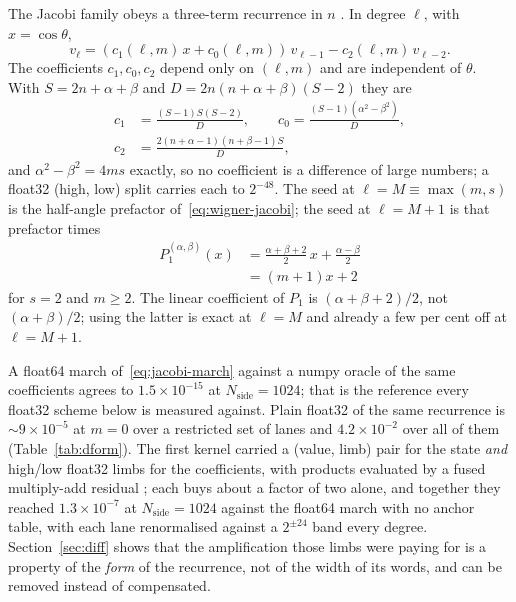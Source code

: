 \documentclass[usenatbib,useAMS]{mnras}
\begin{document}
The Jacobi family obeys a three-term recurrence in $n$ \citep[NIST DLMF 18.9.1]{olver2010}. In degree $\ell$, with $x=\cos\theta$,
\begin{equation}
\label{eq:jacobi-march}
  v_\ell
  =(c_1(\ell,m)\,x+c_0(\ell,m))\,v_{\ell-1}
   -c_2(\ell,m)\,v_{\ell-2}.
\end{equation}
The coefficients $c_1,c_0,c_2$ depend only on $(\ell,m)$ and are independent of $\theta$. With $S=2n+\alpha+\beta$ and $D=2n(n+\alpha+\beta)(S-2)$ they are
\begin{equation}
\label{eq:coef}
\begin{split}
c_1&=\frac{(S-1)S(S-2)}{D},\qquad
c_0=\frac{(S-1)(\alpha^2-\beta^2)}{D},\\
c_2&=\frac{2(n+\alpha-1)(n+\beta-1)S}{D},
\end{split}
\end{equation}
and $\alpha^2-\beta^2=4ms$ exactly, so no coefficient is a difference of large numbers; a float32 (high, low) split carries each to $2^{-48}$. The seed at $\ell=M\equiv\max(m,s)$ is the half-angle prefactor of~\eqref{eq:wigner-jacobi}; the seed at $\ell=M+1$ is that prefactor times
\begin{equation}
\label{eq:p1}
\begin{split}
  P_1^{(\alpha,\beta)}(x)
  &=\frac{\alpha+\beta+2}{2}\,x+\frac{\alpha-\beta}{2}\\
  &=(m+1)x+2
\end{split}
\end{equation}
for $s=2$ and $m\ge2$. The linear coefficient of $P_1$ is $(\alpha+\beta+2)/2$, not $(\alpha+\beta)/2$; using the latter is exact at $\ell=M$ and already a few per cent off at $\ell=M+1$.

A float64 march of~\eqref{eq:jacobi-march} against a numpy oracle of the same coefficients agrees to $1.5\times10^{-15}$ at $N_{\mathrm{side}}=1024$; that is the reference every float32 scheme below is measured against. Plain float32 of the same recurrence is $\sim9\times10^{-5}$ at $m=0$ over a restricted set of lanes and $4.2\times10^{-2}$ over all of them (Table~\ref{tab:dform}). The first kernel carried a (value, limb) pair for the state \emph{and} high/low float32 limbs for the coefficients, with products evaluated by a fused multiply-add residual \citep{dekker1971}; each buys about a factor of two alone, and together they reached $1.3\times10^{-7}$ at $N_{\mathrm{side}}=1024$ against the float64 march with no anchor table, with each lane renormalised against a $2^{\pm24}$ band every degree. Section~\ref{sec:diff} shows that the amplification those limbs were paying for is a property of the \emph{form} of the recurrence, not of the width of its words, and can be removed instead of compensated.
\end{document}
